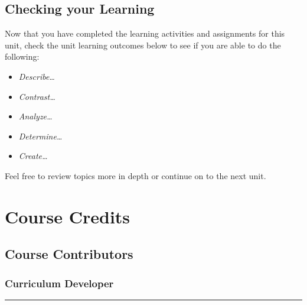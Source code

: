 \documentclass[
]{book}
\providecommand{\tightlist}{%
  \setlength{\itemsep}{0pt}\setlength{\parskip}{0pt}}
\begin{document}
\hypertarget{checking-your-learning-1}{%
\section*{Checking your Learning}\label{checking-your-learning-1}}

\begin{progress}
Now that you have completed the learning activities and assignments for this unit, check the unit learning outcomes below to see if you are able to do the following:

\begin{itemize}
\tightlist
\item
  \emph{Describe\ldots{}}\\
\item
  \emph{Contrast\ldots{}}\\
\item
  \emph{Analyze\ldots{}}\\
\item
  \emph{Determine\ldots{}}\\
\item
  \emph{Create\ldots{}}
\end{itemize}

Feel free to review topics more in depth or continue on to the next unit.
\end{progress}

\hypertarget{course-credits}{%
\chapter*{Course Credits}\label{course-credits}}

\hypertarget{course-contributors}{%
\section*{Course Contributors}\label{course-contributors}}

\hypertarget{curriculum-developer}{%
\subsection*{Curriculum Developer}\label{curriculum-developer}}

\begin{center}\rule{0.5\linewidth}{0.5pt}\end{center}
\end{document}
